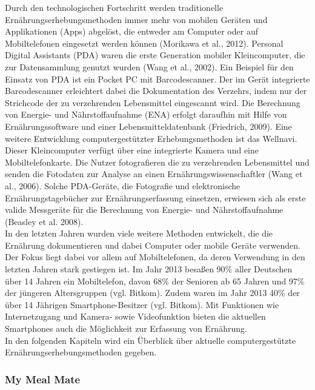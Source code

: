 Durch den technologischen Fortschritt werden traditionelle Ernährungserhebungsmethoden immer mehr von mobilen Geräten und Applikationen (Apps) abgelöst, die entweder am Computer oder auf Mobiltelefonen eingesetzt werden können (Morikawa et al., 2012). Personal Digital Assistants (PDA) waren die erste Generation mobiler Kleincomputer, die zur Datensammlung genutzt wurden (Wang et al., 2002). Ein Beispiel für den Einsatz von PDA ist ein Pocket PC mit Barcodescanner. Der im Gerät integrierte Barcodescanner erleichtert dabei die Dokumentation des Verzehrs, indem nur der Strichcode der zu verzehrenden Lebensmittel eingescannt wird. Die Berechnung von Energie- und Nährstoffaufnahme (ENA) erfolgt daraufhin mit Hilfe von Ernährungssoftware und einer Lebensmitteldatenbank (Friedrich, 2009). Eine weitere Entwicklung computergestützter Erhebungsmethoden ist das Wellnavi. Dieser Kleincomputer verfügt über eine integrierte Kamera und eine Mobiltelefonkarte. Die Nutzer fotografieren die zu verzehrenden Lebensmittel und senden die Fotodaten zur Analyse an einen Ernährungswissenschaftler (Wang et al., 2006). Solche PDA-Geräte, die Fotografie und elektronische Ernährungstagebücher zur Ernährungserfassung einsetzen,  erwiesen sich als erste valide Messgeräte  für die Berechnung von Energie- und Nährstoffaufnahme (Beasley et al. 2008). \\
In den letzten Jahren wurden viele weitere Methoden entwickelt, die die Ernährung dokumentieren und dabei Computer oder mobile Geräte verwenden. Der Fokus liegt dabei vor allem auf Mobiltelefonen, da deren Verwendung in den letzten Jahren stark gestiegen ist. Im Jahr 2013 besaßen 90\% aller Deutschen über 14 Jahren ein Mobiltelefon, davon 68\% der Senioren ab 65 Jahren und 97\% der jüngeren Altersgruppen (vgl. Bitkom). Zudem waren im Jahr 2013 40\% der über 14 Jährigen Smartphone-Besitzer (vgl. Bitkom). Mit Funktionen wie Internetzugang und Kamera- sowie Videofunktion bieten die aktuellen Smartphones auch die Möglichkeit zur Erfassung von Ernährung.\\
In den folgenden Kapiteln wird ein Überblick über  aktuelle computergestützte Ernährungserhebungsmethoden gegeben. 



\subsubsection{My Meal Mate}

